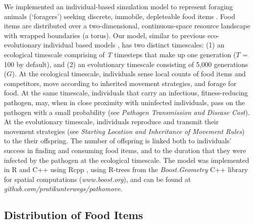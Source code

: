 We implemented an individual-based simulation model to represent foraging animals (`foragers') seeking discrete, immobile, depleteable food items \citep[as in][see \textit{Supplementary Material Fig. 1 -- 2}]{spiegel2017,gupte2021a}.
Food items are distributed over a two-dimensional, continuous-space resource landscape with wrapped boundaries (a torus).
Our model, similar to previous eco-evolutionary individual based models \citep{getz2015, netz2021a, gupte2021a}, has two distinct timescales: (1) an ecological timescale comprising of \textit{T} timesteps that make up one generation ($T$ = 100 by default), and (2) an evolutionary timescale consisting of 5,000 generations ($G$).
At the ecological timescale, individuals sense local counts of food items and competitors, move according to inherited movement strategies, and forage for food.
At the same timescale, individuals that carry an infectious, fitness-reducing pathogen, may, when in close proximity with uninfected individuals, pass on the pathogen with a small probability (see \textit{Pathogen Transmission and Disease Cost}).
At the evolutionary timescale, individuals reproduce and transmit their movement strategies (see \textit{Starting Location and Inheritance of Movement Rules}) to the their offspring. The number of offspring is linked both to individuals' success in finding and consuming food items, and to the duration that they were infected by the pathogen at the ecological timescale.
The model was implemented in R and C++ using Rcpp \citep{rcoreteam2020,eddelbuettel2013}, using R-trees from the \textit{Boost.Geometry} C++ library for spatial computations (\textit{www.boost.org}), and can be found at \textit{github.com/pratikunterwegs/pathomove}.

\subsection*{Distribution of Food Items}

